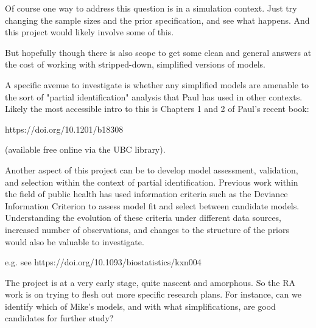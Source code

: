 \documentclass[
10pt, %
a4paper, %
oneside, %
headinclude,footinclude, %
BCOR5mm, %
]{scrartcl}
\begin{document}
Of course one way to address this question is in a simulation context. Just try changing the sample sizes and the prior specification, and see what happens. And this project would likely involve some of this.

But hopefully though there is also scope to get some clean and general answers at the cost of working with stripped-down, simplified versions of models.

A specific avenue to investigate is whether any simplified models are amenable to the sort of "partial identification" analysis that Paul has used in other contexts. Likely the most accessible intro to this is Chapters 1 and 2 of Paul's recent book:

https://doi.org/10.1201/b18308

(available free online via the UBC library).

Another aspect of this project can be to develop model assessment, validation, and selection within the context of partial identification. Previous work within the field of public health has used information criteria such as the Deviance Information Criterion to assess model fit and select between candidate models. Understanding the evolution of these criteria under different data sources, increased number of observations, and changes to the structure of the priors would also be valuable to investigate.

e.g. see https://doi.org/10.1093/biostatistics/kxn004

The project is at a very early stage, quite nascent and amorphous. So the RA work is on trying to flesh out more specific research plans. For instance, can we identify which of Mike's models, and with what simplifications, are good candidates for further study?



\let\thefootnote\relax{}

\let\thefootnote\relax{}

\end{document}
